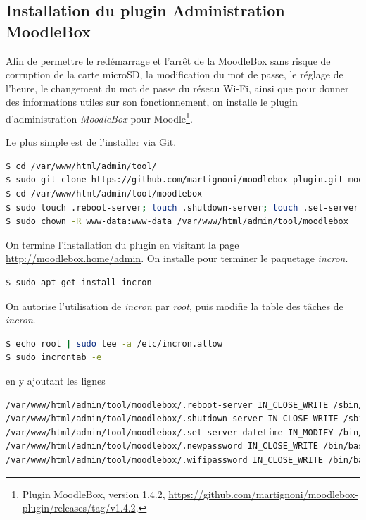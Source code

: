 \documentclass[11pt]{article}
\begin{document}
\subsection{Installation du plugin Administration MoodleBox}

Afin de permettre le redémarrage et l'arrêt de la MoodleBox sans risque de corruption de la carte microSD, la modification du mot de passe, le réglage de l'heure, le changement du mot de passe du réseau Wi-Fi, ainsi que pour donner des informations utiles sur son fonctionnement, on installe le plugin d'administration \emph{MoodleBox} pour Moodle\footnote{Plugin MoodleBox, version 1.4.2, \url{https://github.com/martignoni/moodlebox-plugin/releases/tag/v1.4.2}.}.

Le plus simple est de l'installer via Git.

\begin{lstlisting}[language=bash]
$ cd /var/www/html/admin/tool/
$ sudo git clone https://github.com/martignoni/moodlebox-plugin.git moodlebox
$ cd /var/www/html/admin/tool/moodlebox
$ sudo touch .reboot-server; touch .shutdown-server; touch .set-server-datetime; touch .newpassword; touch .wifipassword
$ sudo chown -R www-data:www-data /var/www/html/admin/tool/moodlebox
\end{lstlisting}

On termine l'installation du plugin en visitant la page \url{http://moodlebox.home/admin}. On installe pour terminer le paquetage \emph{incron}.

\begin{lstlisting}[language=bash]
$ sudo apt-get install incron
\end{lstlisting}

On autorise l'utilisation de \emph{incron} par \emph{root}, puis modifie la table des tâches de \emph{incron}.

\begin{lstlisting}[language=bash]
$ echo root | sudo tee -a /etc/incron.allow
$ sudo incrontab -e
\end{lstlisting}

en y ajoutant les lignes
\begin{lstlisting}[language=bash]
/var/www/html/admin/tool/moodlebox/.reboot-server IN_CLOSE_WRITE /sbin/shutdown -r now
/var/www/html/admin/tool/moodlebox/.shutdown-server IN_CLOSE_WRITE /sbin/shutdown -h now
/var/www/html/admin/tool/moodlebox/.set-server-datetime IN_MODIFY /bin/bash /var/www/html/admin/tool/moodlebox/.set-server-datetime
/var/www/html/admin/tool/moodlebox/.newpassword IN_CLOSE_WRITE /bin/bash /var/www/html/admin/tool/moodlebox/bin/changepassword.sh
/var/www/html/admin/tool/moodlebox/.wifipassword IN_CLOSE_WRITE /bin/bash /var/www/html/admin/tool/moodlebox/bin/setwifipassword.sh
\end{lstlisting}
\end{document}
